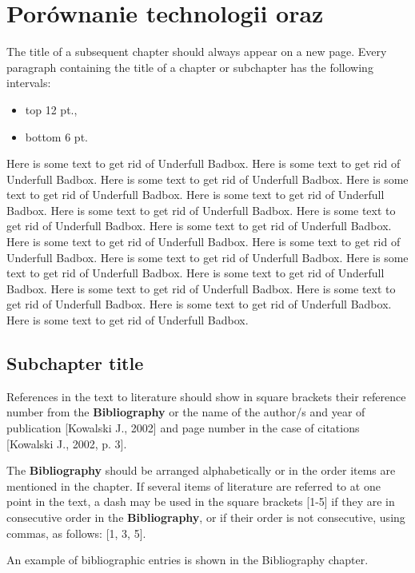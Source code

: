 \chapter{Porównanie technologii oraz }

The title of a subsequent chapter should always appear on a new page. Every paragraph containing the title of a chapter or subchapter has the following intervals:
\begin{itemize}
	\item top 12 pt., 
	\item bottom 6 pt.
\end{itemize}

Here is some text to get rid of Underfull Badbox. Here is some text to get rid of Underfull Badbox. Here is some text to get rid of Underfull Badbox. Here is some text to get rid of Underfull Badbox. Here is some text to get rid of Underfull Badbox. Here is some text to get rid of Underfull Badbox. Here is some text to get rid of Underfull Badbox. Here is some text to get rid of Underfull Badbox. Here is some text to get rid of Underfull Badbox. Here is some text to get rid of Underfull Badbox. Here is some text to get rid of Underfull Badbox. Here is some text to get rid of Underfull Badbox. Here is some text to get rid of Underfull Badbox. Here is some text to get rid of Underfull Badbox. Here is some text to get rid of Underfull Badbox. Here is some text to get rid of Underfull Badbox. Here is some text to get rid of Underfull Badbox.



\section{Subchapter title}

References in the text to literature should show in square brackets their reference number from the \textbf{Bibliography} \cite{hennessy2012computer-architecture} or the name of the author/s and year of publication [Kowalski J., 2002] and page number in the case of citations [Kowalski J., 2002, p. 3].

The \textbf{Bibliography} should be arranged alphabetically or in the order items are mentioned in the chapter. If several items of literature are referred to at one point in the text, a dash may be used in the square brackets [1-5] if they are in consecutive order in the \textbf{Bibliography}, or if their order is not consecutive, using commas, as follows: [1, 3, 5]. 

An example of bibliographic entries is shown in the Bibliography chapter.

